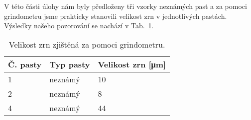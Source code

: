 V této části úlohy nám byly předloženy tři vzorky neznámých past a za pomoci grindometru jsme prakticky stanovili velikost zrn v jednotlivých pastách. 
Výsledky našeho pozorování se nachází v Tab.~\ref{tab:grindometr}.

\begin{table}[h!]
    \caption{Velikost zrn zjištěná za pomoci grindometru.}
    \centering
    \def\arraystretch{1.4}
    \begin{tabular}{l|l|l}
        Č. pasty    & Typ pasty   & Velikost zrn [\unit{\micro\meter}]   \\ \hline
        1    & neznámý   & 10   \\ \hline
        2    & neznámý   &  8   \\ \hline
        4    & neznámý   & 44   \\ 
        \end{tabular}
    \label{tab:grindometr}
\end{table}
